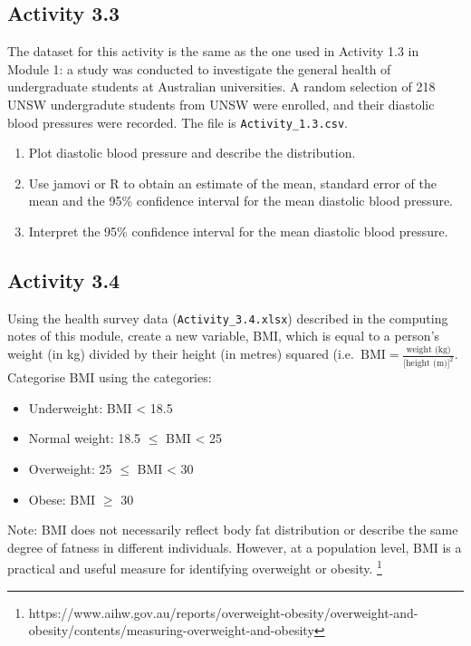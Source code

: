 \documentclass[
  a4paper,
]{memoir}
\providecommand{\tightlist}{%
  \setlength{\itemsep}{0pt}\setlength{\parskip}{0pt}}
\begin{document}
\subsection*{Activity 3.3}\label{activity-3.3}

The dataset for this activity is the same as the one used in Activity
1.3 in Module 1: a study was conducted to investigate the general health
of undergraduate students at Australian universities. A random selection
of 218 UNSW undergradute students from UNSW were enrolled, and their
diastolic blood pressures were recorded. The file is
\texttt{Activity\_1.3.csv}.

\begin{enumerate}
\def\labelenumi{\alph{enumi})}
\tightlist
\item
  Plot diastolic blood pressure and describe the distribution.
\item
  Use jamovi or R to obtain an estimate of the mean, standard error of
  the mean and the 95\% confidence interval for the mean diastolic blood
  pressure.
\item
  Interpret the 95\% confidence interval for the mean diastolic blood
  pressure.
\end{enumerate}

\subsection*{Activity 3.4}\label{activity-3.4}

Using the health survey data (\texttt{Activity\_3.4.xlsx}) described in
the computing notes of this module, create a new variable, BMI, which is
equal to a person's weight (in kg) divided by their height (in metres)
squared
(i.e.~\(\text{BMI} = \frac{\text{weight (kg)}}{\text{[height (m)]}^2}\).
Categorise BMI using the categories:

\begin{itemize}
\tightlist
\item
  Underweight: BMI \textless{} 18.5
\item
  Normal weight: 18.5 \(\le\) BMI \textless{} 25
\item
  Overweight: 25 \(\le\) BMI \textless{} 30
\item
  Obese: BMI \(\ge\) 30
\end{itemize}

Note: BMI does not necessarily reflect body fat distribution or describe
the same degree of fatness in different individuals. However, at a
population level, BMI is a practical and useful measure for identifying
overweight or obesity. \footnote{https://www.aihw.gov.au/reports/overweight-obesity/overweight-and-obesity/contents/measuring-overweight-and-obesity}
\end{document}

